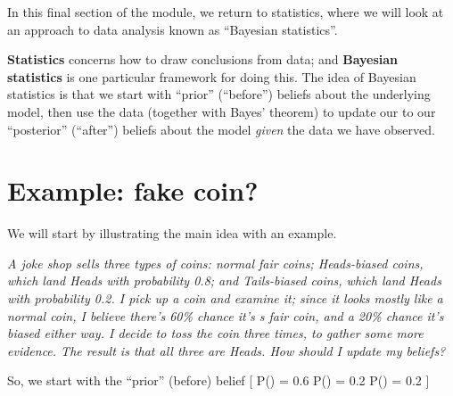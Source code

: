 \documentclass[
  letterpaper,
  DIV=11,
  numbers=noendperiod]{scrreprt}
\theoremstyle{remark}
\begin{document}
In this final section of the module, we return to statistics, where we
will look at an approach to data analysis known as ``Bayesian
statistics''.

\textbf{Statistics} concerns how to draw conclusions from data; and
\textbf{Bayesian statistics} is one particular framework for doing this.
The idea of Bayesian statistics is that we start with ``prior''
(``before'') beliefs about the underlying model, then use the data
(together with Bayes' theorem) to update our to our ``posterior''
(``after'') beliefs about the model \emph{given} the data we have
observed.

\hypertarget{fake-coin}{%
\section{Example: fake coin?}\label{fake-coin}}

We will start by illustrating the main idea with an example.

\emph{A joke shop sells three types of coins: normal fair coins;
Heads-biased coins, which land Heads with probability 0.8; and
Tails-biased coins, which land Heads with probability 0.2. I pick up a
coin and examine it; since it looks mostly like a normal coin, I believe
there's 60\% chance it's s fair coin, and a 20\% chance it's biased
either way. I decide to toss the coin three times, to gather some more
evidence. The result is that all three are Heads. How should I update my
beliefs?}

So, we start with the ``prior'' (before) belief {[}
\mathbb P() = 0.6 \qquad \mathbb P() = 0.2
\qquad \mathbb P() = 0.2 {]}
\end{document}
